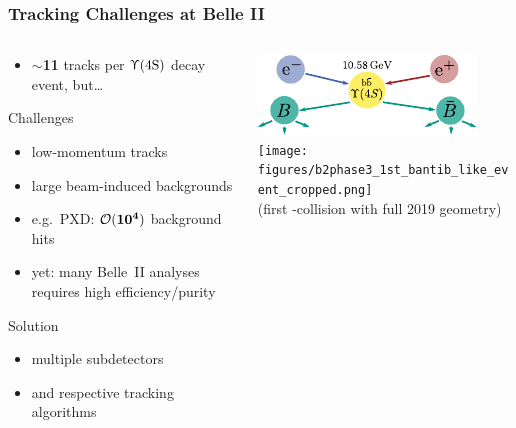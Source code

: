 \documentclass[18pt, aspectratio=169]{beamer}
\begin{document}
\begin{frame}
  \frametitle{Tracking Challenges at Belle II}
  \begin{columns}
    \begin{column}{0.5\textwidth}
      \begin{itemize}
      \item \textcolor{kit-blue100}{$\sim$\textbf{11} tracks} per $\Upupsilon(\text{4S})$ decay event, but\ldots
      \end{itemize}
      \begin{alertblock}{Challenges}
        \begin{itemize}
        \item low-momentum tracks
        \item large beam-induced backgrounds
        \item e.g.\ PXD: \textcolor{kit-red100}{$\mathcal{O}({\bf 10^4})$ background hits}
        \item yet: many Belle~II analyses requires high efficiency/purity
        \end{itemize}

      \end{alertblock}
      \begin{block}{Solution}
        \begin{itemize}
        \item multiple subdetectors
        \item and respective tracking algorithms
        \end{itemize}
      \end{block}
    \end{column}
    \begin{column}{0.5\textwidth}
      \centering
      \includegraphics[width=.7\textwidth]{figures/eplus_eminus_to_b_bar_diagram.pdf}\\
      \texttt{[image: figures/b2phase3\_1st\_bantib\_like\_event\_cropped.png]}\\
      \scriptsize (first \PB{}\APB-collision with full 2019 geometry)
    \end{column}
  \end{columns}
\end{frame}
\end{document}
